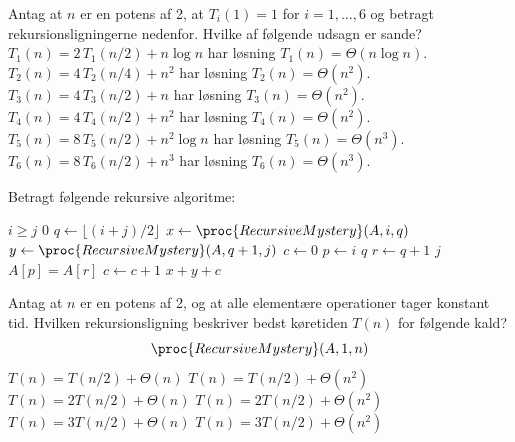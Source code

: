 Antag at $n$ er en potens af 2, at $T_i(1)=1$ for $i=1,\dots,6$ og betragt rekursionsligningerne nedenfor. Hvilke af følgende udsagn er sande?
\fleresvar
\mulighederstart
\svar $T_1(n) = 2\,T_1(n/2) + n \log n$ har løsning $T_1(n) = \Theta(n \log n)$.
\svar $T_2(n) = 4\,T_2(n/4) + n^2$ har løsning $T_2(n) = \Theta(n^2)$.\korrekt
\svar $T_3(n) = 4\,T_3(n/2) + n$ har løsning $T_3(n) = \Theta(n^2)$.\korrekt
\svar $T_4(n) = 4\,T_4(n/2) + n^2$ har løsning $T_4(n) = \Theta(n^2)$.
\svar $T_5(n) = 8\,T_5(n/2) + n^2 \log n$ har løsning $T_5(n) = \Theta(n^3)$.\korrekt
\svar $T_6(n) = 8\,T_6(n/2) + n^3$ har løsning $T_6(n) = \Theta(n^3)$.
\mulighederslut
{}


Betragt følgende rekursive algoritme:
\begin{codebox}
  \li \If $i \ge j$
  \li \Then
        \Return $0$
      \End
  \li $q \gets \lfloor (i+j)/2 \rfloor$
  \li $x \gets \proc{RecursiveMystery}(A,i,q)$
  \li $y \gets \proc{RecursiveMystery}(A,q+1,j)$
  \li $c \gets 0$
  \li \For $p \gets i$ \To $q$
  \li \Do
        \For $r \gets q+1$ \To $j$
  \li   \Do
          \If $A[p] = A[r]$
  \li     \Then
            $c \gets c+1$
          \End
        \End
      \End
  \li \Return $x+y+c$
\end{codebox}
Antag at \(n\) er en potens af 2, og at alle elementære operationer tager konstant tid.
Hvilken rekursionsligning beskriver bedst køretiden \(T(n)\) for følgende kald?
\[
\proc{RecursiveMystery}(A,1,n)
\]
\etsvar
\mulighederstart
\svar \(T(n)=T(n/2)+\Theta(n)\)
\svar \(T(n)=T(n/2)+\Theta(n^2)\)
\svar \(T(n)=2T(n/2)+\Theta(n)\)
\svar \(T(n)=2T(n/2)+\Theta(n^2)\) \korrekt
\svar \(T(n)=3T(n/2)+\Theta(n)\)
\svar \(T(n)=3T(n/2)+\Theta(n^2)\)
\mulighederslut

